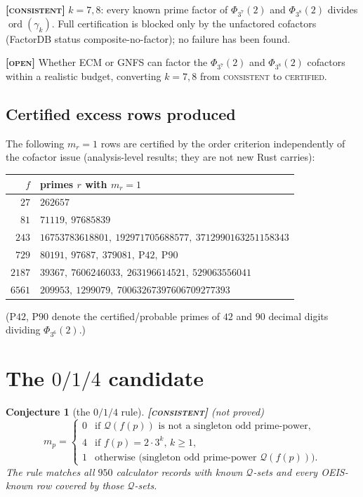 \documentclass[11pt]{article}
\theoremstyle{plain}
\newtheorem{conjecture}{Conjecture}
\theoremstyle{definition}
\newcommand{\ord}{\operatorname{ord}}
\newcommand{\Qset}{\mathcal{Q}}
\newcommand{\CONSISTENT}{\textbf{[\textsc{consistent}]}}
\newcommand{\OPEN}{\textbf{[\textsc{open}]}}
\begin{document}
\CONSISTENT{} $k=7,8$: every known prime factor of $\Phi_{3^7}(2)$ and
$\Phi_{3^8}(2)$ divides $\ord(\gamma_k)$. Full certification is blocked
only by the unfactored cofactors (FactorDB status composite-no-factor);
no failure has been found.

\OPEN{} Whether ECM or GNFS can factor the $\Phi_{3^7}(2)$ and
$\Phi_{3^8}(2)$ cofactors within a realistic budget, converting $k=7,8$
from \textsc{consistent} to \textsc{certified}.

\subsection{Certified excess rows produced}

The following $m_r=1$ rows are certified by the order criterion
independently of the cofactor issue (analysis-level results; they are not
new Rust carries):
\begin{center}
\begin{tabular}{rl}
\toprule
$f$ & primes $r$ with $m_r=1$ \\
\midrule
$27$   & $262657$ \\
$81$   & $71119,\ 97685839$ \\
$243$  & $16753783618801,\ 192971705688577,\ 3712990163251158343$ \\
$729$  & $80191,\ 97687,\ 379081,\ \mathrm{P}42,\ \mathrm{P}90$ \\
$2187$ & $39367,\ 7606246033,\ 263196614521,\ 529063556041$ \\
$6561$ & $209953,\ 1299079,\ 70063267397606709277393$ \\
\bottomrule
\end{tabular}
\end{center}
($\mathrm{P}42$, $\mathrm{P}90$ denote the certified/probable primes of
$42$ and $90$ decimal digits dividing $\Phi_{3^6}(2)$.)

\section{The $0/1/4$ candidate}\label{sec:rule}

\begin{conjecture}[the $0/1/4$ rule]\label{conj:rule}
\CONSISTENT{} (not proved)
\[
  m_p=
  \begin{cases}
    0 & \text{if $\Qset(f(p))$ is not a singleton odd prime-power,}\\
    4 & \text{if $f(p)=2\cdot3^k$, $k\geq1$,}\\
    1 & \text{otherwise (singleton odd prime-power $\Qset(f(p))$).}
  \end{cases}
\]
The rule matches all $950$ calculator records with known $\Qset$-sets and
every OEIS-known row covered by those $\Qset$-sets.
\end{conjecture}
\end{document}
